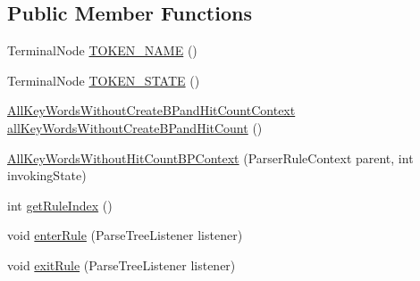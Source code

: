 \subsection*{Public Member Functions}
\begin{DoxyCompactItemize}
\item 
Terminal\+Node \hyperlink{classgov_1_1nasa_1_1jpf_1_1inspector_1_1client_1_1parser_1_1_console_grammar_parser_1_1_all_key_4612626c1f72cea22831f9624187dc64_a00b92189509fc28ec208518dac666d96}{T\+O\+K\+E\+N\+\_\+\+N\+A\+ME} ()
\item 
Terminal\+Node \hyperlink{classgov_1_1nasa_1_1jpf_1_1inspector_1_1client_1_1parser_1_1_console_grammar_parser_1_1_all_key_4612626c1f72cea22831f9624187dc64_afa7799fe43fb1e5755456b91fa3481c4}{T\+O\+K\+E\+N\+\_\+\+S\+T\+A\+TE} ()
\item 
\hyperlink{classgov_1_1nasa_1_1jpf_1_1inspector_1_1client_1_1parser_1_1_console_grammar_parser_1_1_all_key_5423188b2439879f44801649cdee10f6}{All\+Key\+Words\+Without\+Create\+B\+Pand\+Hit\+Count\+Context} \hyperlink{classgov_1_1nasa_1_1jpf_1_1inspector_1_1client_1_1parser_1_1_console_grammar_parser_1_1_all_key_4612626c1f72cea22831f9624187dc64_ad7e5178788066fccdd0c38f9ce4a6e6c}{all\+Key\+Words\+Without\+Create\+B\+Pand\+Hit\+Count} ()
\item 
\hyperlink{classgov_1_1nasa_1_1jpf_1_1inspector_1_1client_1_1parser_1_1_console_grammar_parser_1_1_all_key_4612626c1f72cea22831f9624187dc64_a6ff264df3703ad7906f2ffc833d0010e}{All\+Key\+Words\+Without\+Hit\+Count\+B\+P\+Context} (Parser\+Rule\+Context parent, int invoking\+State)
\item 
int \hyperlink{classgov_1_1nasa_1_1jpf_1_1inspector_1_1client_1_1parser_1_1_console_grammar_parser_1_1_all_key_4612626c1f72cea22831f9624187dc64_a9885a811d7934956fe076ca039f46b5b}{get\+Rule\+Index} ()
\item 
void \hyperlink{classgov_1_1nasa_1_1jpf_1_1inspector_1_1client_1_1parser_1_1_console_grammar_parser_1_1_all_key_4612626c1f72cea22831f9624187dc64_a31165e541cbce1309b0d343b5f3d1b3d}{enter\+Rule} (Parse\+Tree\+Listener listener)
\item 
void \hyperlink{classgov_1_1nasa_1_1jpf_1_1inspector_1_1client_1_1parser_1_1_console_grammar_parser_1_1_all_key_4612626c1f72cea22831f9624187dc64_ab18d4d5d93bcaa04acfe9c53b401d2d7}{exit\+Rule} (Parse\+Tree\+Listener listener)
\end{DoxyCompactItemize}
